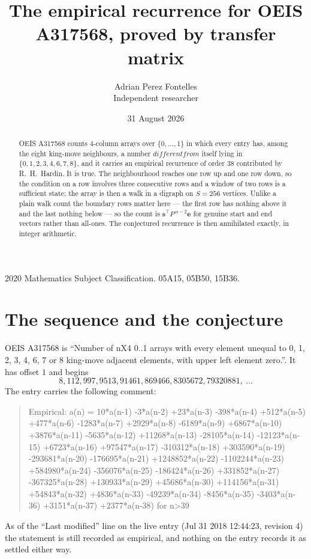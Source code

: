 \documentclass[11pt,a4paper]{article}
\title{The empirical recurrence for OEIS A317568, proved by transfer matrix}
\author{Adrian Perez Fontelles\\ \small Independent researcher}
\date{31 August 2026}
\theoremstyle{plain}
\theoremstyle{definition}
\begin{document}
\maketitle

\begin{abstract}
OEIS A317568 counts $4$-column arrays over $\{0,\dots,1\}$ in which every entry has,
among the eight king-move neighbours, a number $different from$ itself lying in $\{0,1,2,3,4,6,7,8\}$, and it carries an empirical
recurrence of order $38$ contributed by R.~H.~Hardin. It is true. The neighbourhood
reaches one row up and one row down, so the condition on a row involves three consecutive
rows and a window of two rows is a sufficient state; the array is then a walk in a digraph
on $S=256$ vertices. Unlike a plain walk count the boundary rows matter here --- the first
row has nothing above it and the last nothing below --- so the count is
$\mathbf{s}^{\!\top}P^{\,n-2}\mathbf{e}$ for genuine start and end vectors rather than
all-ones. The conjectured recurrence is then annihilated exactly, in integer arithmetic.
\end{abstract}

\noindent\small 2020 Mathematics Subject Classification. 05A15, 05B50, 15B36.\normalsize

\section{The sequence and the conjecture}

OEIS A317568 is ``Number of nX4 0..1 arrays with every element unequal to 0, 1, 2, 3, 4, 6, 7 or 8 king-move adjacent elements, with upper left element zero.''. It has offset
$1$ and begins
\[
8, 112, 997, 9513, 91461, 869466, 8305672, 79320881,\ \dots
\]
The entry carries the following comment:
\begin{quote}\small
Empirical: a(n) = 10*a(n-1) -3*a(n-2) +23*a(n-3) -398*a(n-4) +512*a(n-5) +477*a(n-6) -1283*a(n-7) +2929*a(n-8) -6189*a(n-9) +6867*a(n-10) +3876*a(n-11) -5635*a(n-12) +11268*a(n-13) -28105*a(n-14) -12123*a(n-15) +6723*a(n-16) +97547*a(n-17) -310312*a(n-18) +303590*a(n-19) -293681*a(n-20) -176695*a(n-21) +1248852*a(n-22) -1102244*a(n-23) +584980*a(n-24) -356076*a(n-25) -186424*a(n-26) +331852*a(n-27) -367325*a(n-28) +130933*a(n-29) +45686*a(n-30) +114156*a(n-31) +54843*a(n-32) +4836*a(n-33) -49239*a(n-34) -8456*a(n-35) -3403*a(n-36) +3151*a(n-37) +2377*a(n-38) for n>39
\end{quote}
As of the ``Last modified'' line on the live entry (Jul 31 2018 12:44:23, revision
4) the statement is still recorded as empirical, and nothing on the entry
records it as settled either way.
\end{document}
